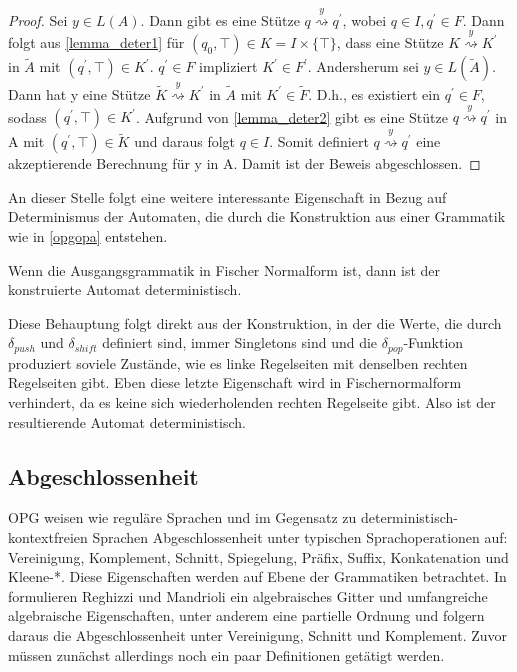 \begin{proof}
Sei $y \in L(A)$. Dann gibt es eine Stütze $q \stackrel{y} {\rightsquigarrow} q^\prime$, wobei $q\in I, q^\prime \in F$. Dann folgt aus \autoref{lemma_deter1} für $(q_0, \top) \in K=I \times \{\top\}$, dass eine Stütze $K \stackrel{y}{\rightsquigarrow}K^\prime$ in $\tilde{A}$ mit $(q^\prime, \top) \in K^\prime $. $q^\prime \in F$ impliziert $K^\prime \in F^\prime$.
Andersherum sei $y \in L(\tilde{A})$. Dann hat y eine Stütze $\tilde{K}\stackrel{y}{\rightsquigarrow}K^\prime$ in $\tilde{A}$ mit $K^\prime \in \tilde{F}$. D.h., es existiert ein $q^\prime \in F$, sodass $(q^\prime, \top) \in K^\prime$. Aufgrund von \autoref{lemma_deter2} gibt es eine Stütze $q \stackrel{y} {\rightsquigarrow} q^\prime$ in A mit $(q^\prime, \top) \in \tilde{K}$ und daraus folgt $q \in I$. Somit definiert $q\stackrel{y}{\rightsquigarrow}q^\prime$ eine akzeptierende Berechnung für y in A.
Damit ist der Beweis abgeschlossen. 
\end{proof}

An dieser Stelle folgt eine weitere interessante Eigenschaft in Bezug auf Determinismus der Automaten, die  durch die Konstruktion aus einer Grammatik wie in \ref{opgopa} entstehen.
\begin{corollary}
Wenn die Ausgangsgrammatik in Fischer Normalform ist, dann ist der konstruierte Automat deterministisch.
\end{corollary}
Diese Behauptung folgt direkt aus der Konstruktion, in der die Werte, die durch $\delta_{push}$ und $\delta_{shift}$ definiert sind, immer Singletons sind und die $\delta_{pop}$-Funktion produziert soviele Zustände, wie es linke Regelseiten mit denselben rechten Regelseiten gibt. Eben diese letzte Eigenschaft wird in Fischernormalform verhindert, da es keine sich wiederholenden rechten Regelseite gibt. Also ist der resultierende Automat deterministisch. 

\subsection{Abgeschlossenheit}
OPG weisen wie reguläre Sprachen und im Gegensatz zu deterministisch-kontextfreien Sprachen Abgeschlossenheit unter typischen Sprachoperationen auf: Vereinigung, Komplement, Schnitt, Spiegelung, Präfix, Suffix, Konkatenation und Kleene-*.
Diese Eigenschaften werden auf Ebene der Grammatiken betrachtet. In \cite{algebraic_properties} formulieren Reghizzi und Mandrioli ein algebraisches Gitter und umfangreiche algebraische Eigenschaften, unter anderem eine partielle Ordnung und folgern daraus die Abgeschlossenheit unter Vereinigung, Schnitt und Komplement. Zuvor müssen zunächst allerdings noch ein paar Definitionen getätigt werden. 

